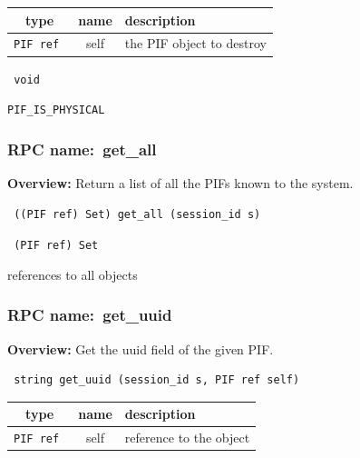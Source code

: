 
 
\vspace{0.3cm}
\begin{tabular}{|c|c|p{7cm}|}
 \hline
{\bf type} & {\bf name} & {\bf description} \\ \hline
{\tt PIF ref } & self & the PIF object to destroy \\ \hline 

\end{tabular}

\vspace{0.3cm}

{\tt 
void
}



\vspace{0.3cm}

 {\tt PIF\_IS\_PHYSICAL}

\vspace{0.6cm}
\subsubsection{RPC name:~get\_all}

{\bf Overview:} 
Return a list of all the PIFs known to the system.

\begin{verbatim} ((PIF ref) Set) get_all (session_id s)\end{verbatim}


\vspace{0.3cm}

{\tt 
(PIF ref) Set
}


references to all objects
\vspace{0.3cm}
\vspace{0.3cm}
\vspace{0.3cm}
\subsubsection{RPC name:~get\_uuid}

{\bf Overview:} 
Get the uuid field of the given PIF.

\begin{verbatim} string get_uuid (session_id s, PIF ref self)\end{verbatim}



 
\vspace{0.3cm}
\begin{tabular}{|c|c|p{7cm}|}
 \hline
{\bf type} & {\bf name} & {\bf description} \\ \hline
{\tt PIF ref } & self & reference to the object \\ \hline 

\end{tabular}

